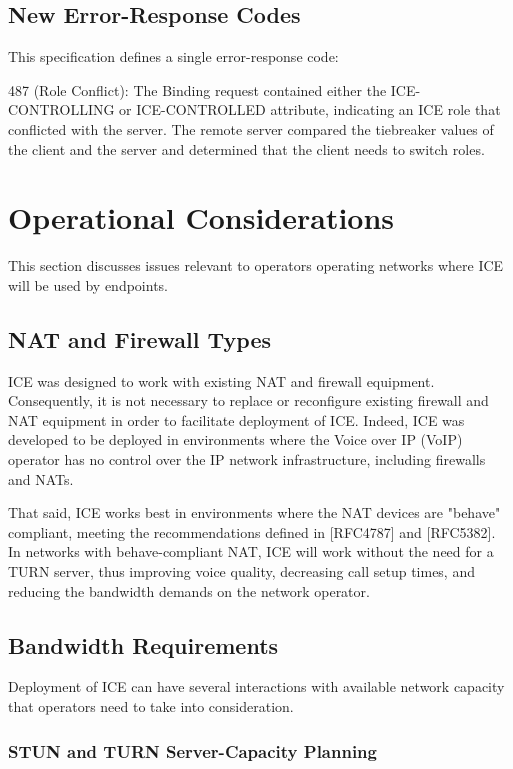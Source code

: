 \documentclass{article}
\begin{document}
\subsection{New Error-Response Codes}

This specification defines a single error-response code:

487 (Role Conflict):  The Binding request contained either the ICE- CONTROLLING or ICE-CONTROLLED attribute, indicating an ICE role that conflicted with the server.  The remote server compared the tiebreaker values of the client and the server and determined that the client needs to switch roles.

\section{Operational Considerations}

This section discusses issues relevant to operators operating networks where ICE will be used by endpoints.

\subsection{NAT and Firewall Types}

ICE was designed to work with existing NAT and firewall equipment. Consequently, it is not necessary to replace or reconfigure existing firewall and NAT equipment in order to facilitate deployment of ICE. Indeed, ICE was developed to be deployed in environments where the Voice over IP (VoIP) operator has no control over the IP network infrastructure, including firewalls and NATs.

That said, ICE works best in environments where the NAT devices are "behave" compliant, meeting the recommendations defined in [RFC4787] and [RFC5382].  In networks with behave-compliant NAT, ICE will work without the need for a TURN server, thus improving voice quality, decreasing call setup times, and reducing the bandwidth demands on the network operator.

\subsection{Bandwidth Requirements}

Deployment of ICE can have several interactions with available network capacity that operators need to take into consideration.

\subsubsection{STUN and TURN Server-Capacity Planning}
\end{document}
